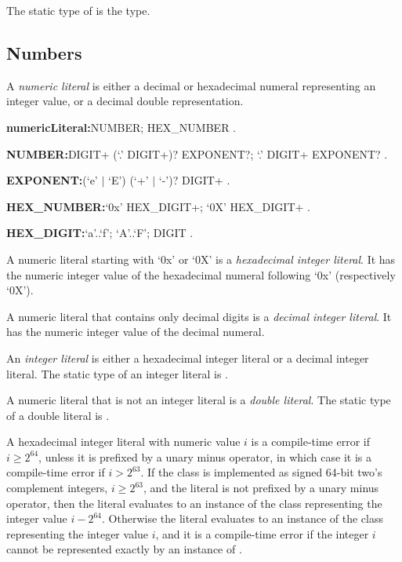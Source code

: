 \documentclass{article}
\begin{document}
\LMHash{}
The static type of \NULL{} is the  type.


\subsection{Numbers}

\LMHash{}
A {\em numeric literal} is either a decimal or hexadecimal numeral representing an integer value, or a decimal double representation.

\begin{grammar}
{\bf numericLiteral:}NUMBER;
  HEX\_NUMBER
  .

{\bf NUMBER:}DIGIT+ (`{\escapegrammar.}' DIGIT+)? EXPONENT?;
  {`\escapegrammar .}' DIGIT+ EXPONENT?
  .

{\bf EXPONENT:}(`e' $|$ `E') (`+' $|$ `-')? DIGIT+
  .

{\bf HEX\_NUMBER:}`0x' HEX\_DIGIT+;
  `0X' HEX\_DIGIT+
  .

{\bf HEX\_DIGIT:}`a'{\escapegrammar ..}`f';
  `A'{\escapegrammar ..}`F';
  DIGIT
  .
\end{grammar}

\LMHash{}
A numeric literal starting with `0x' or `0X'
is a {\em hexadecimal integer literal}.
It has the numeric integer value of the hexadecimal numeral
following `0x' (respectively `0X').

\LMHash{}
A numeric literal that contains only decimal digits is a {\em decimal integer literal}.
It has the numeric integer value of the decimal numeral.

\LMHash{}
An {\em integer literal} is either a hexadecimal integer literal or a decimal integer literal.
The static type of an integer literal is .

\LMHash{}
A numeric literal that is not an integer literal is a {\em double literal}.
The static type of a double literal is .

\LMHash{}
A hexadecimal integer literal with numeric value $i$ is a compile-time
error if $i \ge{} 2^{64}$, unless it is prefixed by a unary minus operator,
in which case it is a compile-time error if $i \gt{} 2^{63}$.
If the  class is implemented as signed 64-bit two's complement integers,
$i \ge{} 2^{63}$, and the literal is not prefixed by a unary minus operator, then
the literal evaluates to an instance of the  class representing the integer value $i - 2^{64}$.
Otherwise the literal evaluates to an instance of the  class representing
the integer value $i$,
and it is a compile-time error if the integer $i$ cannot be represented exactly
by an instance of .
\end{document}
